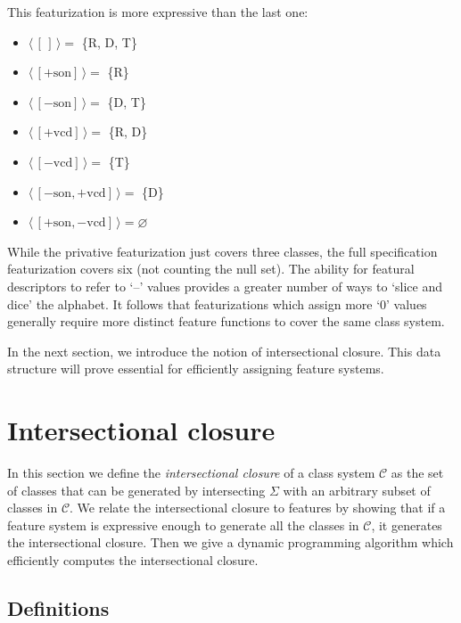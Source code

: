 \documentclass[11pt, oneside]{article}   	%
\begin{document}
\noindent This featurization is more expressive than the last one: \begin{itemize}
    \item $\langle \, [\,] \, \rangle =$ \{R, D, T\}
    \item $\langle \, [+\text{son}] \, \rangle =$ \{R\}
    \item $\langle \, [-\text{son}] \, \rangle =$ \{D, T\}
    \item $\langle \, [+\text{vcd}] \, \rangle =$ \{R, D\}
    \item $\langle \, [-\text{vcd}]  \, \rangle=$ \{T\}
    \item $\langle \, [-\text{son},+\text{vcd}] \, \rangle =$ \{D\}
    \item $\langle \, [+\text{son},-\text{vcd}] \, \rangle = \varnothing$
    \end{itemize}

\vspace{\baselineskip} \noindent While the privative featurization just covers three classes, the full specification featurization covers six (not counting the null set). The ability for featural descriptors to refer to `--' values provides a greater number of ways to `slice and dice' the alphabet. It follows that featurizations which assign more `$0$' values generally require more distinct feature functions to cover the same class system.

\vspace{\baselineskip} In the next section, we introduce the notion of intersectional closure. This data structure will prove essential for efficiently assigning feature systems.

\section{Intersectional closure}

In this section we define the \textit{intersectional closure} of a class system $\mathcal{C}$ as the set of classes that can be generated by intersecting $\Sigma$ with an arbitrary subset of classes in $\mathcal{C}$. We relate the intersectional closure to features by showing that if a feature system is expressive enough to generate all the classes in $\mathcal{C}$, it generates the intersectional closure. Then we give a dynamic programming algorithm which efficiently computes the intersectional closure. 

\subsection{Definitions}
\end{document}
